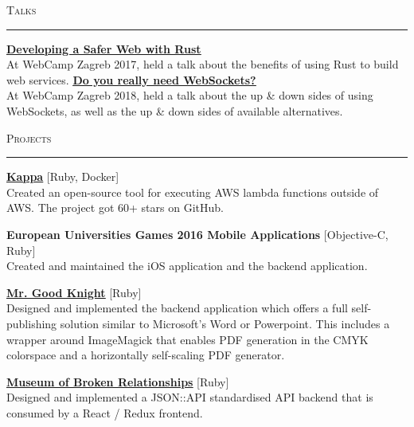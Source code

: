 \documentclass[10pt, a4paper, final, onecolumn, oneside, notitlepage]{article}
\newcommand{\sectionspacing}[0]{ \vspace{10pt} } %
\newcommand{\sectionrule}[0]{ \rule[6pt]{\textwidth}{0.5pt} } %
\renewcommand{\section}[1]{\sectionspacing {\large \scshape #1} \sectionrule}
\begin{document}
\begin{center}
  \section{Talks}
  \begin{flushleft}
    \textbf{\href{https://2017.webcampzg.org/talks/developing-a-safer-web-with-rust/}{\underline{Developing a Safer Web with Rust}}}\\
    At WebCamp Zagreb 2017, held a talk about the benefits of using Rust to build web services.
    \vspace{2mm}
    \textbf{\href{https://2018.webcampzg.org/talks/do-you-really-need-websockets/}{\underline{Do you really need WebSockets?}}}\\
    At WebCamp Zagreb 2018, held a talk about the up \& down sides of using WebSockets, as well as the up \& down sides of available alternatives.
    \vspace{45mm}
  \end{flushleft}

  \section{Projects}
  \begin{flushleft}
    \textbf {\href{https://github.com/monorkin/kappa}{\underline{Kappa}}} [Ruby, Docker]\\
    Created an open-source tool for executing AWS lambda functions outside of AWS. The project got 60+ stars on GitHub.
    \vspace{2mm}

    \textbf{European Universities Games 2016 Mobile Applications} [Objective-C, Ruby]\\
    Created and maintained the iOS application and the backend application. \\
    \vspace{2mm}

    \textbf{\href{https://www.mrgoodknight.de/}{\underline{Mr. Good Knight}}} [Ruby]\\
    Designed and implemented the backend application which offers a full
    self-publishing solution similar to Microsoft's Word or Powerpoint.
    This includes a wrapper around ImageMagick that enables PDF generation in the
    CMYK colorspace and a horizontally self-scaling PDF generator. \\
    \vspace{2mm}

    \textbf{\href{https://brokenships.com}{\underline{Museum of Broken Relationships}}} [Ruby]\\
    Designed and implemented a JSON::API standardised API backend that is
    consumed by a React / Redux frontend. \\
    \vspace{2mm}


\end{flushleft}
\end{center}
\end{document}
